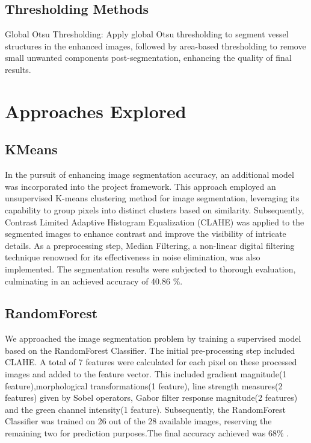 \documentclass{article}
\begin{document}
\subsection{Thresholding Methods}
Global Otsu Thresholding: Apply global Otsu thresholding to segment vessel structures in the enhanced images, followed by area-based thresholding to remove small unwanted components post-segmentation, enhancing the quality of final results.


\section{Approaches Explored}

\subsection{KMeans}
In the pursuit of enhancing image segmentation accuracy, an additional model was incorporated into the project framework. This approach employed an unsupervised K-means clustering method for image segmentation, leveraging its capability to group pixels into distinct clusters based on similarity. Subsequently, Contrast Limited Adaptive Histogram Equalization (CLAHE) was applied to the segmented images to enhance contrast and improve the visibility of intricate details. As a preprocessing step, Median Filtering, a non-linear digital filtering technique renowned for its effectiveness in noise elimination, was also implemented. The segmentation results were subjected to thorough evaluation, culminating in an achieved accuracy of 40.86 \%.\



\subsection{RandomForest}
We approached the image segmentation problem by training a supervised model based on the RandomForest Classifier. The initial pre-processing step included CLAHE. A total of 7 features were calculated for each pixel on these processed images and added to the feature vector. This included gradient magnitude(1 feature),morphological transformations(1 feature), line strength measures(2 features) given by Sobel operators, Gabor filter response magnitude(2 features) and the green channel intensity(1 feature). Subsequently, the RandomForest Classifier was trained on 26 out of the 28 available images, reserving the remaining two for prediction purposes.The final accuracy achieved was 68\% .
\end{document}
